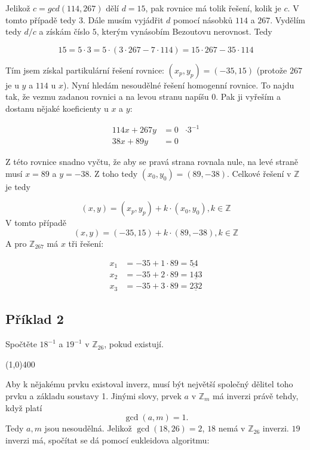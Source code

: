 \documentclass{article}
\begin{document}
Jelikož $c = gcd(114,267)$ dělí $d = 15$, pak rovnice má tolik řešení, kolik je $c$. V tomto případě tedy $3$. Dále musím vyjádřit $d$ pomocí násobků $114$ a $267$. Vydělím tedy $d/c$ a získám číslo $5$, kterým vynásobím Bezoutovu nerovnost. Tedy

$$15 = 5\cdot 3 = 5\cdot (3\cdot 267 - 7 \cdot 114) = 15\cdot 267 - 35\cdot 114$$

Tím jsem získal partikulární řešení rovnice: $(x_p, y_p) = (-35, 15)$ (protože $267$ je u $y$ a $114$ u $x$).
Nyní hledám nesoudělné řešení homogenní rovnice. To najdu tak, že vezmu zadanou rovnici a na levou stranu napíšu $0$. Pak ji vyřeším a dostanu nějaké koeficienty u $x$ a $y$:

\begin{align*}
114x + 267y &= 0 & \cdot 3^{-1} \\
38x + 89y & = 0 
\end{align*} 
  
Z této rovnice snadno vyčtu, že aby se pravá strana rovnala nule, na levé straně musí $x = 89$ a $y = -38$. Z toho tedy $(x_0, y_0) = (89, -38)$.
Celkové řešení v $\mathbb{Z}$ je tedy

$$ (x, y) = (x_p, y_p) + k\cdot (x_0, y_0), k \in \mathbb{Z} $$
V tomto případě
$$ (x, y) = (-35, 15) + k\cdot (89, -38),k \in \mathbb{Z} $$
A pro $\mathbb{Z}_{267}$ má $x$ tři řešení:

\begin{align*}
x_1 &= -35 + 1\cdot 89 = \underline{54} \\
x_2 &= -35 + 2\cdot 89 = \underline{143} \\
x_3 &= -35 + 3\cdot 89 = \underline{232}
\end{align*} 

\subsection{Příklad 2}
Spočtěte $18^{-1}$ a $19^{-1}$ v $\mathbb{Z}_{26}$, pokud existují.

\line(1,0){400}

Aby k nějakému prvku existoval inverz, musí být největší společný dělitel toho prvku a základu soustavy 1. Jinými slovy, prvek $a$ v $\mathbb{Z}_m$ má inverzi právě tehdy, když platí
\begin{equation}
	 \gcd(a,m) = 1.
\end{equation}
Tedy \(a, m\) jsou nesoudělná. 
Jelikož $\gcd(18,26) = 2$, $18$ nemá v $\mathbb{Z}_{26}$ inverzi. $19$ inverzi má, spočítat se dá pomocí eukleidova algoritmu:
\end{document}
